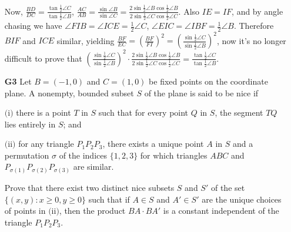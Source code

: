\documentclass[11pt,a4paper]{article}
\begin{document}
\begin{itemize}
Now, $\frac{BD}{DC}=\frac{\tan\frac12\angle C}{\tan\frac12\angle B}$,
$\frac{AC}{AB}=\frac{\sin\angle B}{\sin\angle C}=\frac{2\sin\frac 12\angle B\cos\frac 12\angle B}{2\sin\frac 12\angle C\cos\frac 12\angle C}$.
Also $IE=IF$, and by angle chasing we have $\angle FIB=\angle ICE=\frac12\angle C$,
$\angle EIC=\angle IBF=\frac12\angle B$.
Therefore $BIF$ and $ICE$ similar, yielding $\frac{BF}{EC}=(\frac{BF}{FI})^2=(\frac{\sin\frac12\angle C}{\sin\frac12\angle B})^2$,
now it's no longer difficult to prove that $(\frac{\sin\frac12\angle C}{\sin\frac12\angle B})^2\cdot \frac{2\sin\frac 12\angle B\cos\frac 12\angle B}{2\sin\frac 12\angle C\cos\frac 12\angle C}=\frac{\tan\frac12\angle C}{\tan\frac12\angle B}$.

\item[\textbf{G3}]
Let $B = (-1, 0)$ and $C = (1, 0)$ be fixed points on the coordinate plane. A nonempty, bounded subset $S$ of the plane is said to be nice if

$\text{(i)}$ there is a point $T$ in $S$ such that for every point $Q$ in $S$, the segment $TQ$ lies entirely in $S$; and

$\text{(ii)}$ for any triangle $P_1P_2P_3$, there exists a unique point $A$ in $S$ and a permutation $\sigma$ of the indices $\{1, 2, 3\}$ for which triangles $ABC$ and $P_{\sigma(1)}P_{\sigma(2)}P_{\sigma(3)}$ are similar.

Prove that there exist two distinct nice subsets $S$ and $S'$ of the set $\{(x, y) : x \geq 0, y \geq 0\}$ such that if $A \in S$ and $A' \in S'$ are the unique choices of points in $\text{(ii)}$, then the product $BA \cdot BA'$ is a constant independent of the triangle $P_1P_2P_3$.


\end{itemize}
\end{document}
